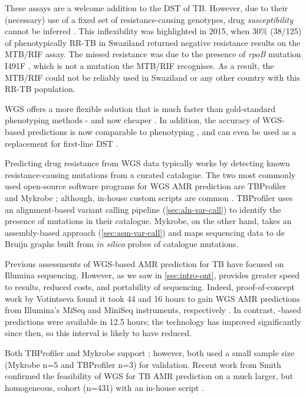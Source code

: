 These \xpert{} assays are a welcome addition to the DST of TB. However, due to their (necessary) use of a fixed set of resistance-causing genotypes, drug \emph{susceptibility} cannot be inferred \cite{Sanchez2015}. This inflexibility was highlighted in 2015, when 30\% (38/125) of phenotypically RR-TB in Swaziland returned negative resistance results on the \xpert{} MTB/RIF assay. The missed resistance was due to the presence of \textit{rpoB} mutation I491F \cite{Sanchez2015}, which is not a mutation the \xpert{} MTB/RIF recognises. As a result, the \xpert{} MTB/RIF could not be reliably used in Swaziland or any other country with this RR-TB population.

\noindent
WGS offers a more flexible solution that is much faster than gold-standard phenotyping methods - and now cheaper \cite{Pankhurst2016,Votintseva2015,Votintseva2017}. In addition, the accuracy of WGS-based predictions is now comparable to phenotyping \cite{hunt2019,walker2015,bradley2015,Pankhurst2016,Votintseva2015}, and can even be used as a replacement for first-line DST \cite{cryptic2018}. 

Predicting drug resistance from WGS data typically works by detecting known resistance-causing mutations from a curated catalogue. The two most commonly used open-source software programs for WGS AMR prediction are TBProfiler \cite{coll2015,phelan2019} and Mykrobe \cite{bradley2015,hunt2019}; although, in-house custom scripts are common \cite{smith2020,cryptic2018}. TBProfiler uses an alignment-based variant calling pipeline (\autoref{sec:aln-var-call}) to identify the presence of mutations in their catalogue. Mykrobe, on the other hand, takes an assembly-based approach (\autoref{sec:asm-var-call}) and maps sequencing data to de Bruijn graphs built from \textit{in silico} probes of catalogue mutations. 

Previous assessments of WGS-based AMR prediction for TB have focused on Illumina sequencing. However, as we saw in \autoref{sec:intro-ont}, \ont{} provides greater speed to results, reduced costs, and portability of sequencing. Indeed, proof-of-concept work by Votintseva \etal{} found it took 44 and 16 hours to gain WGS AMR predictions from Illumina's MiSeq and MiniSeq instruments, respectively \cite{Votintseva2017}. In contrast, \ont{}-based predictions were available in 12.5 hours; the technology has improved significantly since then, so this interval is likely to have reduced.

Both TBProfiler and Mykrobe support \ont{}; however, both used a small sample size (Mykrobe n=5 and TBProfiler n=3) for validation. Recent work from Smith \etal{} confirmed the feasibility of \ont{} WGS for TB AMR prediction on a much larger, but homogeneous, cohort (n=431) with an in-house script \cite{smith2020}.

